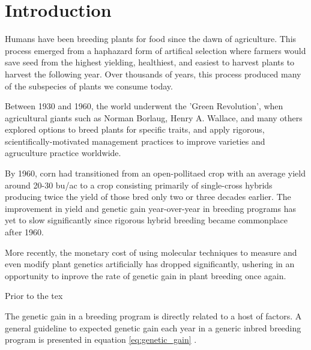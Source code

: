\section{Introduction}

Humans have been breeding plants for food since the dawn of agriculture. This process
emerged from a haphazard form of artifical selection where farmers would save seed from the 
highest yielding, healthiest, and easiest to harvest plants to harvest the following year. 
Over thousands of years, this process produced many of the subspecies of plants we consume today. 

Between 1930 and 1960, the world underwent the 'Green Revolution', when agricultural giants such
as Norman Borlaug, Henry A. Wallace, and many others explored options to breed plants for
specific traits, and apply rigorous, scientifically-motivated management practices to improve
varieties and agruculture practice worldwide.

By 1960, corn had transitioned from an open-pollitaed crop with an average yield around 20-30 bu/ac
to a crop consisting primarily of single-cross hybrids producing twice the yield of those bred 
only two or three decades earlier. The improvement in yield and genetic gain year-over-year in
breeding programs has yet to slow significantly since rigorous hybrid breeding became 
commonplace after 1960.

More recently, the monetary cost of using molecular techniques to measure and even modify plant
genetics artificially has dropped significantly, ushering in an opportunity to inprove 
the rate of genetic gain in plant breeding once again.

Prior to the tex 

The genetic gain in a breeding program is directly related to a host of factors. A 
general guideline to expected genetic gain each year in a generic inbred breeding 
program is presented in equation \ref{eq:genetic_gain} \citep{fehr1987}.

